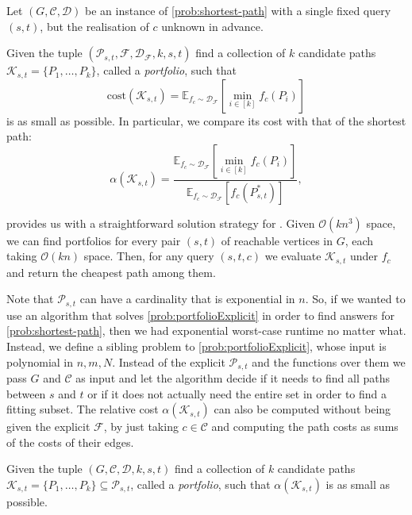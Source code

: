 Let $(G, \mathcal C, \mathcal D)$ be an instance of \cref{prob:shortest-path} with a single fixed query $(s, t)$, but the realisation of $c$ unknown in advance.

\begin{problem}[$(s,t)$-Portfolio]
\label{prob:portfolioExplicit}
Given the tuple $(\mathcal{P}_{s,t}, \mathcal F, \mathcal D_{\mathcal F}, k, s, t)$ find a collection of $k$ candidate paths $\mathcal{K}_{s,t} = \{P_1,\dots,P_k\}$, called a \emph{portfolio}, such that
\[
\text{cost}(\mathcal K_{s,t}) = \mathbb{E}_{f_c \sim \mathcal D_{\mathcal F}}\left[\min_{i \in [k]} f_c(P_i)\right]
\]
is as small as possible. In particular, we compare its cost with that of the shortest path:
\[
\alpha(\mathcal K_{s,t}) = \frac{\mathbb{E}_{f_c \sim \mathcal D_{\mathcal F}}\left[\min_{i \in [k]} f_c(P_i)\right]}{\mathbb{E}_{f_c \sim \mathcal D_{\mathcal F}}\left[f_c(P^*_{s,t})\right]},
\]
\end{problem}

 provides us with a straightforward solution strategy for . Given $\mathcal O(k n^3)$ space, we can find portfolios for every pair $(s,t)$ of reachable vertices in $G$, each taking $\mathcal O(k n)$ space. Then, for any query $(s, t, c)$ we evaluate $\mathcal K_{s,t}$ under $f_c$ and return the cheapest path among them.

Note that $\mathcal P_{s,t}$ can have a cardinality that is exponential in $n$. So, if we wanted to use an algorithm that solves \cref{prob:portfolioExplicit} in order to find answers for \cref{prob:shortest-path}, then we had exponential worst-case runtime no matter what. Instead, we define a sibling problem to \cref{prob:portfolioExplicit}, whose input is polynomial in $n, m, N$.
Instead of the explicit $\mathcal P_{s,t}$ and the functions over them we pass $G$ and $\mathcal C$ as input and let the algorithm decide if it needs to find all paths between $s$ and $t$ or if it does not actually need the entire set in order to find a fitting subset. The relative cost $\alpha(\mathcal K_{s,t})$ can also be computed without being given the explicit $\mathcal F$, by just taking $c\in \mathcal C$ and computing the path costs as sums of the costs of their edges.

\begin{problem}
\label{prob:portfolio}
Given the tuple $(G, \mathcal C, \mathcal D, k, s, t)$ find a collection of $k$ candidate paths $\mathcal{K}_{s,t} = \{P_1,\dots,P_k\} \subseteq \mathcal P_{s,t}$, called a \emph{portfolio}, such that $\alpha(\mathcal K_{s,t})$ is as small as possible.
\end{problem}

